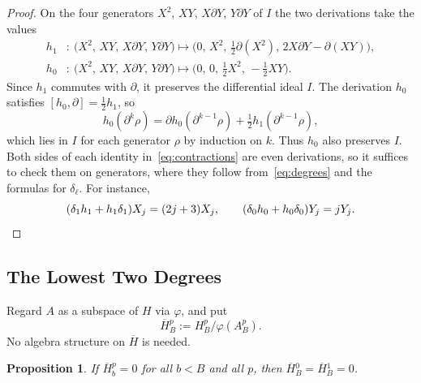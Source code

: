 \documentclass[11pt]{amsart}
\numberwithin{equation}{section}
\newtheorem{proposition}[theorem]{Proposition}
\theoremstyle{definition}
\theoremstyle{remark}
\newcommand{\dd}{\partial}
\newcommand{\Hb}{\overline{H}}
\begin{document}
\begin{proof}
On the four generators $X^2$, $XY$, $X\dd Y$, $Y\dd Y$ of $I$ the two derivations take the values
\begin{align}
\label{eq:h1-gens}h_1&:\ \bigl(X^2,\,XY,\,X\dd Y,\,Y\dd Y\bigr)\longmapsto\bigl(0,\,X^2,\,\tfrac12\dd(X^2),\,2X\dd Y-\dd(XY)\bigr),\\
\label{eq:h0-gens}h_0&:\ \bigl(X^2,\,XY,\,X\dd Y,\,Y\dd Y\bigr)\longmapsto\bigl(0,\,0,\,\tfrac12X^2,\,-\tfrac12XY\bigr).
\end{align}
Since $h_1$ commutes with $\dd$, it preserves the differential ideal $I$. The derivation $h_0$ satisfies $[h_0,\dd]=\frac12h_1$, so
\begin{equation}\label{eq:h0-induction}
h_0(\dd^k\rho)=\dd h_0(\dd^{k-1}\rho)+\tfrac12h_1(\dd^{k-1}\rho),
\end{equation}
which lies in $I$ for each generator $\rho$ by induction on $k$. Thus $h_0$ also preserves $I$. Both sides of each identity in~\eqref{eq:contractions} are even derivations, so it suffices to check them on generators, where they follow from~\eqref{eq:degrees} and the formulas for $\delta_\ell$. For instance,
\begin{equation}\label{eq:homotopy-check}
(\delta_1h_1+h_1\delta_1)X_j=(2j+3)X_j,\qquad(\delta_0h_0+h_0\delta_0)Y_j=jY_j .\qedhere
\end{equation}
\end{proof}

\subsection{The Lowest Two Degrees}
Regard $A$ as a subspace of $H$ via $\varphi$, and put
\begin{equation}\label{eq:Hbar}
\Hb{}_B^p:=H_B^p/\varphi(A_B^p).
\end{equation}
No algebra structure on $\Hb$ is needed.

\begin{proposition}\label{prop:low}
If $\Hb{}_b^p=0$ for all $b<B$ and all $p$, then $\Hb{}_B^0=\Hb{}_B^1=0$.
\end{proposition}
\end{document}
